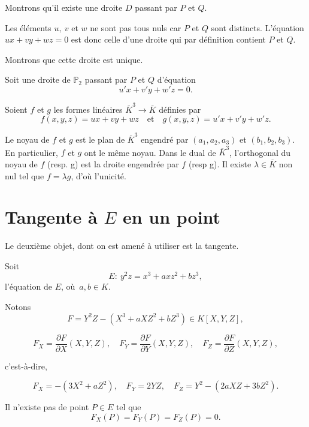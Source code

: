 \begin{demonstration}

    Montrons qu'il existe une droite $D$ passant par $P$ et $Q$.

    Les éléments $u, \ v$ et $w$ ne sont pas tous nuls car $P$ et $Q$ sont distincts.
    L'équation $ux+vy+wz =0$ est donc celle d'une droite qui par définition contient $P$ et
    $Q$.

    Montrons que cette droite est unique.

    Soit une droite de $\mathbb{P}_{2}$ passant par $P$ et $Q$ d'équation
    \[
    u'x+v'y+w'z = 0 
    .\] 

    Soient $f$ et $g$ les formes linéaires $\overline{K}^3 \to \overline{K}$ définies par 
    \[
    f(x,y,z) = ux + vy + wz \quad \text{et} \quad g(x,y,z) = u'x+v'y+w'z
    .\] 

    Le noyau de $f$ et $g$ est le plan de $\overline{K}^3$ engendré par $\left( a_1,a_2,a_3
    \right) $ et $\left( b_1,b_2,b_3 \right) $. En particulier, $f$ et $g$ ont le
    même noyau. Dans le dual de $\overline{K}^3$, l'orthogonal du noyau de $f$ 
    (resp. g) est la droite engendrée par $f$ (resp g). Il existe $\lambda \in
    \overline{K}$ non nul tel que $f = \lambda g$, d'où l'unicité.
\end{demonstration}

\section{Tangente à $E$ en un point}

Le deuxième objet, dont on est amené à utiliser est la tangente.

Soit 
\[
E:\ y^2z = x^3 + axz^2 + bz^3
,\] l'équation de $E$, où $a,b \in K$.

Notons
\[
    F = Y^2Z - \left( X^3 + aXZ^2 + bZ^3 \right) \in K[X,Y,Z]
,\] 

\[
F_{X} = \frac{\partial F}{\partial X}(X,Y,Z),\quad F_{Y} = \frac{\partial F}{\partial Y}(X,Y,Z),\quad F_{Z} = \frac{\partial F}{\partial Z}(X,Y,Z)
,\] 

c'est-à-dire, 

\[
F_{X} = - \left( 3X^2 + aZ^2 \right),\quad F_{Y} = 2YZ,\quad F_{Z} = Y^2 - \left( 2aXZ + 3bZ^2 \right)
.\] 

\begin{lemme}
    \label{lem:lemme3}
    
    Il n'existe pas de point $P \in E$ tel que
    \[
    F_{X}(P) = F_{Y}(P) = F_{Z}(P) = 0
    .\] 
\end{lemme}

